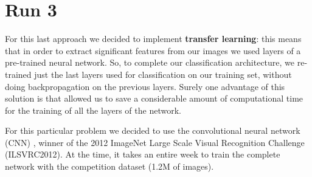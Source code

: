 \section{Run 3}
For this last approach we decided to implement \textbf{transfer learning}: this means that in order to extract significant features from our images we used layers of a pre-trained neural network. So, to complete our classification architecture, we re-trained just the last layers used for classification on our training set, without doing backpropagation on the previous layers. Surely one advantage of this solution is that allowed us to save a considerable amount of computational time for the training of all the layers of the network.

For this particular problem we decided to use the convolutional neural network (CNN) , winner of the 2012 ImageNet Large Scale Visual Recognition Challenge (ILSVRC2012). At the time, it takes an entire week to train the complete network with the competition dataset (1.2M of images).




